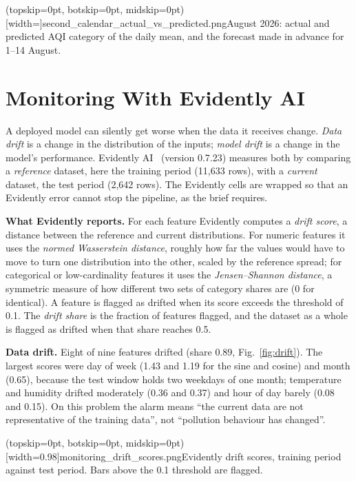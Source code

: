 \documentclass{ieeeaccess}
\begin{document}
\Figure[t!](topskip=0pt, botskip=0pt, midskip=0pt)[width=\textwidth]{second_calendar_actual_vs_predicted.png}{August 2026: actual and predicted AQI category of the daily mean, and the forecast made in advance for 1--14 August.\label{fig:secondcal}}

\section{Monitoring With Evidently AI}
\label{sec:monitoring}

A deployed model can silently get worse when the data it receives change. \emph{Data drift} is a change in the distribution of the inputs; \emph{model drift} is a change in the model's performance. Evidently AI~\cite{evidently} (version 0.7.23) measures both by comparing a \emph{reference} dataset, here the training period (11{,}633 rows), with a \emph{current} dataset, the test period (2{,}642 rows). The Evidently cells are wrapped so that an Evidently error cannot stop the pipeline, as the brief requires.

\textbf{What Evidently reports.} For each feature Evidently computes a \emph{drift score}, a distance between the reference and current distributions. For numeric features it uses the \emph{normed Wasserstein distance}, roughly how far the values would have to move to turn one distribution into the other, scaled by the reference spread; for categorical or low-cardinality features it uses the \emph{Jensen--Shannon distance}, a symmetric measure of how different two sets of category shares are (0 for identical). A feature is flagged as drifted when its score exceeds the threshold of 0.1. The \emph{drift share} is the fraction of features flagged, and the dataset as a whole is flagged as drifted when that share reaches 0.5.

\textbf{Data drift.} Eight of nine features drifted (share 0.89, Fig.~\ref{fig:drift}). The largest scores were day of week (1.43 and 1.19 for the sine and cosine) and month (0.65), because the test window holds two weekdays of one month; temperature and humidity drifted moderately (0.36 and 0.37) and hour of day barely (0.08 and 0.15). On this problem the alarm means ``the current data are not representative of the training data'', not ``pollution behaviour has changed''.

\Figure[t!](topskip=0pt, botskip=0pt, midskip=0pt)[width=0.98\columnwidth]{monitoring_drift_scores.png}{Evidently drift scores, training period against test period. Bars above the 0.1 threshold are flagged.\label{fig:drift}}
\end{document}
